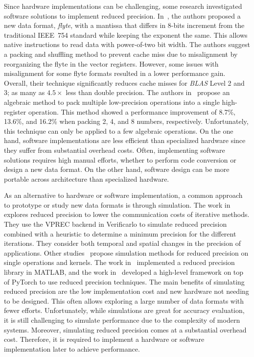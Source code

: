 Since hardware implementations can be challenging, some research investigated
software solutions to implement reduced precision.
In~\cite{Anderson2016-yn}, the authors proposed a new data format, \textit{flyte},
with a mantissa that differs in 8-bits increment from the traditional IEEE~754
standard while keeping the exponent the same.
This allows native instructions to read data with power-of-two bit width.
The authors suggest a packing and shuffling method to prevent cache miss due to misalignment by reorganizing the flyte in the vector registers.
However, some issues with misalignment for some flyte formats resulted in a lower performance gain.
Overall, their technique significantly reduces cache misses for \textit{BLAS} Level 2 and 3; as many as $4.5\times$ less than double precision.
The authors in~\cite{Zucker1994-rg} propose an algebraic method to pack multiple
low-precision operations into a single high-register operation.
This method showed a performance improvement of 8.7\%, 13.6\%, and 16.2\% when packing
2, 4, and 8 numbers, respectively.
Unfortunately, this technique can only be applied to a few algebraic operations.
On the one hand, software implementations are less efficient than specialized hardware
since they suffer from substantial overhead costs.
Often, implementing software solutions requires high manual efforts, whether to
perform code conversion or design a new data format.
On the other hand, software design can be more portable across architecture than specialized hardware.

As an alternative to hardware or software implementation, a common approach to
prototype or study new data formats is through simulation.
The work in~\cite{Chatelain2019-fu} explores reduced precision to lower the communication costs of iterative methods.
They use the VPREC backend in Verificarlo to simulate reduced precision combined
with a heuristic to determine a minimum precision for the different iterations.
They consider both temporal and spatial changes in the precision of applications.
Other studies~\cite{Higham2019-yd,Zhang2019-xv} propose simulation methods for reduced
precision on single operations and kernels.
The work in~\cite{Higham2019-yd} implemented a reduced precision library in MATLAB, and
the work in~\cite{Zhang2019-xv} developed a high-level framework on top of PyTorch to use
reduced precision techniques.
The main benefits of simulating reduced precision are the low implementation cost and new hardware not needing to be designed.
This often allows exploring a large number of data formats with fewer efforts.
Unfortunately, while simulations are great for accuracy evaluation, it is still challenging to simulate performance due to the complexity of modern systems.
Moreover, simulating reduced precision comes at a substantial overhead cost.
Therefore, it is required to implement a hardware or software implementation later to achieve performance.

